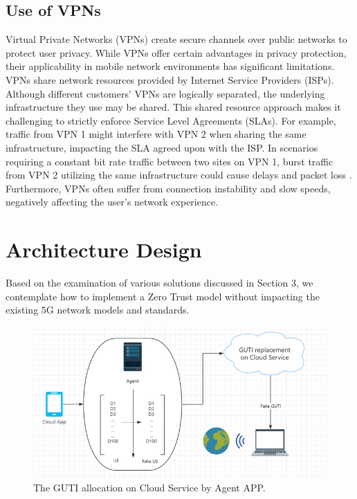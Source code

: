 \documentclass[sigplan,screen]{acmart}
\begin{document}
\subsection{Use of VPNs}
Virtual Private Networks (VPNs) create secure channels over public networks to protect user privacy. While VPNs offer certain advantages in privacy protection, their applicability in mobile network environments has significant limitations. VPNs share network resources provided by Internet Service Providers (ISPs). Although different customers' VPNs are logically separated, the underlying infrastructure they use may be shared. This shared resource approach makes it challenging to strictly enforce Service Level Agreements (SLAs). For example, traffic from VPN 1 might interfere with VPN 2 when sharing the same infrastructure, impacting the SLA agreed upon with the ISP. In scenarios requiring a constant bit rate traffic between two sites on VPN 1, burst traffic from VPN 2 utilizing the same infrastructure could cause delays and packet loss \cite{makhija20235g}. Furthermore, VPNs often suffer from connection instability and slow speeds, negatively affecting the user's network experience. 


\section{Architecture Design}
Based on the examination of various solutions discussed in Section 3, we contemplate how to implement a Zero Trust model without impacting the existing 5G network models and standards.

\begin{figure}[htbp]
\centering
\includegraphics[width=\linewidth]{gutiAllocationApp.png}
\caption{The GUTI allocation on Cloud Service by Agent APP.}
\end{figure}
\end{document}
